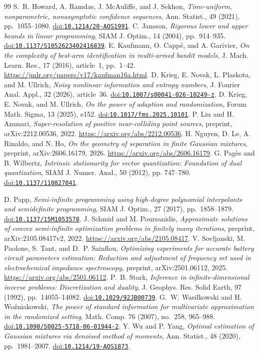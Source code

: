 \documentclass[10pt]{amsart}
\theoremstyle{definition}
\theoremstyle{remark}
\newcommand{\doi}[1]{\href{https://doi.org/#1}{doi:\nolinkurl{#1}}}
\begin{document}
\begin{thebibliography}{99}
 S.~R. Howard, A. Ramdas, J. McAuliffe, and J. Sekhon, \emph{Time-uniform, nonparametric, nonasymptotic confidence sequences}, Ann. Statist., 49 (2021), pp.~1055--1080. \doi{10.1214/20-AOS1991}.
 C. Jansson, \emph{Rigorous lower and upper bounds in linear programming}, SIAM J. Optim., 14 (2004), pp.~914--935. \doi{10.1137/S1052623402416839}.
 E. Kaufmann, O. Capp\'e, and A. Garivier, \emph{On the complexity of best-arm identification in multi-armed bandit models}, J. Mach. Learn. Res., 17 (2016), article~1, pp.~1--42. \url{https://jmlr.org/papers/v17/kaufman16a.html}.
 D. Krieg, E. Novak, L. Plaskota, and M. Ullrich, \emph{Noisy nonlinear information and entropy numbers}, J. Fourier Anal. Appl., 32 (2026), article~36. \doi{10.1007/s00041-026-10249-z}.
 D. Krieg, E. Novak, and M. Ullrich, \emph{On the power of adaption and randomization}, Forum Math. Sigma, 13 (2025), e152. \doi{10.1017/fms.2025.10101}.
 P. Liu and H. Ammari, \emph{Super-resolution of positive near-colliding point sources}, preprint, arXiv:2212.00536, 2022. \url{https://arxiv.org/abs/2212.00536}.
 H. Nguyen, D. Le, A. Rinaldo, and N. Ho, \emph{On the geometry of separation in finite Gaussian mixtures}, preprint, arXiv:2606.16179, 2026. \url{https://arxiv.org/abs/2606.16179}.
 G. Pag\`es and B. Wilbertz, \emph{Intrinsic stationarity for vector quantization: Foundation of dual quantization}, SIAM J. Numer. Anal., 50 (2012), pp. 747--780. \doi{10.1137/110827041}.

 D. Papp, \emph{Semi-infinite programming using high-degree polynomial interpolants and semidefinite programming}, SIAM J. Optim., 27 (2017), pp.~1858--1879. \doi{10.1137/15M1053578}.
 J. Schmid and M. Poursanidis, \emph{Approximate solutions of convex semi-infinite optimization problems in finitely many iterations}, preprint, arXiv:2105.08417v2, 2022. \url{https://arxiv.org/abs/2105.08417}.
 V. Sovljanski, M. Paolone, S. Tant, and D.~P. Sainflou, \emph{Optimizing experiments for accurate battery circuit parameters estimation: Reduction and adjustment of frequency set used in electrochemical impedance spectroscopy}, preprint, arXiv:2501.06112, 2025. \url{https://arxiv.org/abs/2501.06112}.
 P.~B. Stark, \emph{Inference in infinite-dimensional inverse problems: Discretization and duality}, J. Geophys. Res. Solid Earth, 97 (1992), pp.~14055--14082. \doi{10.1029/92JB00739}.
 G.~W. Wasilkowski and H. Wo\'zniakowski, \emph{The power of standard information for multivariate approximation in the randomized setting}, Math. Comp. 76 (2007), no.~258, 965--988. \doi{10.1090/S0025-5718-06-01944-2}.
 Y. Wu and P. Yang, \emph{Optimal estimation of Gaussian mixtures via denoised method of moments}, Ann. Statist., 48 (2020), pp.~1981--2007. \doi{10.1214/19-AOS1873}.
\end{thebibliography}
\end{document}

